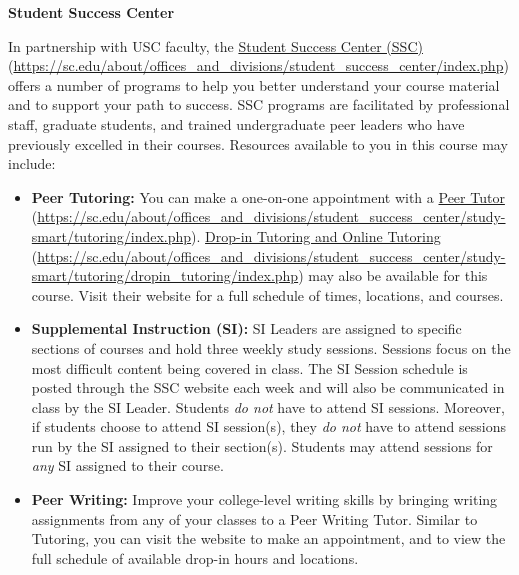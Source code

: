 \documentclass[11pt,letterpaper]{article}
\begin{document}
{\bfseries Student Success Center} \par
In partnership with USC faculty, the \href{https://sc.edu/about/offices\_and\_divisions/student\_success\_center/index.php}{Student Success Center (SSC)} (\url{https://sc.edu/about/offices\_and\_divisions/student\_success\_center/index.php}) offers a number of programs to help you better understand your course material and to support your path to success. SSC programs are facilitated by professional staff, graduate students, and trained undergraduate peer leaders who have previously excelled in their courses. Resources available to you in this course may include:
	\begin{itemize}
	\item {\bfseries Peer Tutoring:} You can make a one-on-one appointment with a \href{https://sc.edu/about/offices\_and\_divisions/student\_success\_center/study-smart/tutoring/index.php}{Peer Tutor} (\url{https://sc.edu/about/offices\_and\_divisions/student\_success\_center/study-smart/tutoring/index.php}). 
	\href{https://sc.edu/about/offices\_and\_divisions/student\_success\_center/study-smart/tutoring/dropin\_tutoring/index.php}{Drop-in Tutoring and Online Tutoring} (\url{https://sc.edu/about/offices\_and\_divisions/student\_success\_center/study-smart/tutoring/dropin\_tutoring/index.php}) may also be available for this course. Visit their website for a full schedule of times, locations, and courses.
	\item {\bfseries Supplemental Instruction (SI):} SI Leaders are assigned to specific sections of courses and hold three weekly study sessions. Sessions focus on the most difficult content being covered in class. The SI Session schedule is posted through the SSC website each week and will also be communicated in class by the SI Leader. Students \textit{do not} have to attend SI sessions. Moreover, if students choose to attend SI session(s), they \textit{do not} have to attend sessions run by the SI assigned to their section(s). Students may attend sessions for \textit{any} SI assigned to their course.
	\item {\bfseries Peer Writing:} Improve your college-level writing skills by bringing writing assignments from any of your classes to a Peer Writing Tutor. Similar to Tutoring, you can visit the website to make an appointment, and to view the full schedule of available drop-in hours and locations.

\end{itemize}
\end{document}
